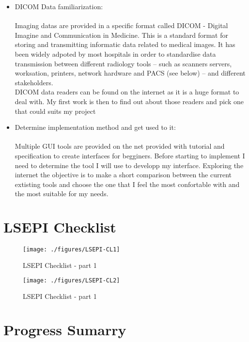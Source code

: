 \documentclass[12pt,twoside]{article}
\begin{document}
\begin{itemize}
\item DICOM Data familiarization:\\ \\
Imaging datas are provided in a specific format called DICOM - Digital Imagine and Communication in Medicine. This is a standard format for storing and transmitting informatic data related to medical images. It has been widely adpoted by most hospitals in order to standardise data transmission between different radiology tools – such as scanners servers, worksation, printers, network hardware and PACS (see below) – and different stakeholders.  \\
DICOM data readers can be found on the internet as it is a huge format to deal with. My first work is then to find out about those readers and pick one that could suits my project 
 

\item Determine implementation method and get used to it:\\ \\
Multiple GUI tools are provided on the net provided with tutorial and specification to create interfaces for begginers. Before starting to implement I need to determine the tool I will use to developp my interface. Exploring the internet the objective is to make a short comparison between the current extisting tools and choose the one that I feel the most confortable with and the most suitable for my needs.

 


\end{itemize}

\clearpage
\section{LSEPI Checklist}

\begin{figure}[ht]
\centering
\texttt{[image: ./figures/LSEPI-CL1]}
\caption{LSEPI Checklist - part 1}
\end{figure}

\clearpage

\begin{figure}[tb]
\centering
\texttt{[image: ./figures/LSEPI-CL2]}
\caption{LSEPI Checklist - part 1}
\end{figure}


\clearpage
\section{Progress Sumarry}
\end{document}
